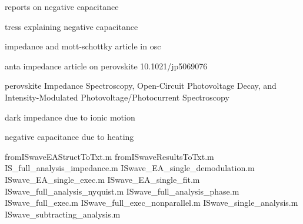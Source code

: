 	reports on negative capacitance \cite{Sanchez2014}

	tress explaining negative capacitance \cite{Ebadi2019}

	impedance and mott-schottky article in osc \cite{Brus2016}

	anta impedance article on perovskite 10.1021/jp5069076

	perovskite Impedance Spectroscopy, Open-Circuit Photovoltage Decay, and Intensity-Modulated Photovoltage/Photocurrent Spectroscopy \cite{Pockett2015}

	dark impedance due to ionic motion \cite{Yang2015e}

	negative capacitance due to heating \cite{Knapp2015}


	fromISwaveEAStructToTxt.m
	fromISwaveResultsToTxt.m
	IS_full_analysis_impedance.m
	ISwave_EA_single_demodulation.m
	ISwave_EA_single_exec.m
	ISwave_EA_single_fit.m
	ISwave_full_analysis_nyquist.m
	ISwave_full_analysis_phase.m
	ISwave_full_exec.m
	ISwave_full_exec_nonparallel.m
	ISwave_single_analysis.m
	ISwave_subtracting_analysis.m

